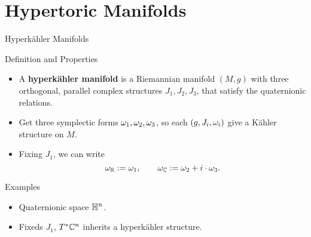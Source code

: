 \section{Hypertoric Manifolds}

\begin{frame}{Hyperk{\"a}hler Manifolds}
    \begin{block}{Definition and Properties}
        \begin{itemize}
            \item A \textbf{hyperk{\"a}hler manifold} is a Riemannian manifold $(M,g)$ with three orthogonal, parallel complex structures $J_{1}, J_{2}, J_{3}$, that satisfy the quaternionic relations.
            \item Get three symplectic forms $\omega_{1}, \omega_{2}, \omega_{3}$, so each $(g,J_{i}, \omega_{i})$ give a K{\"a}hler structure on $M$.
            \item Fixing $J_{1}$, we can write
            \vspace*{-6pt}
            $$ \omega_{\mathbb{R}} := \omega_{1}, \qquad \omega_{\mathbb{C}} := \omega_{2} + i\cdot \omega_{3}. $$
            \vspace*{-18pt}
        \end{itemize}
    \end{block}
    \begin{block}{Examples}
        \begin{itemize}
            \item Quaternionic space $\mathbb{H}^{n}$.
            \item Fixeds $J_{1}$, $T^{\ast}\mathbb{C}^{n}$ inherits a hyperk{\"a}hler structure.
        \end{itemize}
    \end{block}
\end{frame}

